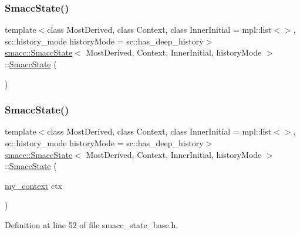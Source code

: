 \subsubsection{\texorpdfstring{Smacc\+State()}{SmaccState()}\hspace{0.1cm}{\footnotesize\ttfamily [1/2]}}
{\footnotesize\ttfamily template$<$class Most\+Derived, class Context, class Inner\+Initial = mpl\+::list$<$$>$, sc\+::history\+\_\+mode history\+Mode = sc\+::has\+\_\+deep\+\_\+history$>$ \\
\hyperlink{classsmacc_1_1SmaccState}{smacc\+::\+Smacc\+State}$<$ Most\+Derived, Context, Inner\+Initial, history\+Mode $>$\+::\hyperlink{classsmacc_1_1SmaccState}{Smacc\+State} (\begin{DoxyParamCaption}{ }\end{DoxyParamCaption})\hspace{0.3cm}{\ttfamily [delete]}}

\mbox{\label{classsmacc_1_1SmaccState_adc225018fe91da47e6e9f1d20150b26a}} 
\subsubsection{\texorpdfstring{Smacc\+State()}{SmaccState()}\hspace{0.1cm}{\footnotesize\ttfamily [2/2]}}
{\footnotesize\ttfamily template$<$class Most\+Derived, class Context, class Inner\+Initial = mpl\+::list$<$$>$, sc\+::history\+\_\+mode history\+Mode = sc\+::has\+\_\+deep\+\_\+history$>$ \\
\hyperlink{classsmacc_1_1SmaccState}{smacc\+::\+Smacc\+State}$<$ Most\+Derived, Context, Inner\+Initial, history\+Mode $>$\+::\hyperlink{classsmacc_1_1SmaccState}{Smacc\+State} (\begin{DoxyParamCaption}\item[{\hyperlink{structsmacc_1_1SmaccState_1_1my__context}{my\+\_\+context}}]{ctx }\end{DoxyParamCaption})\hspace{0.3cm}{\ttfamily [inline]}}



Definition at line 52 of file smacc\+\_\+state\+\_\+base.\+h.


